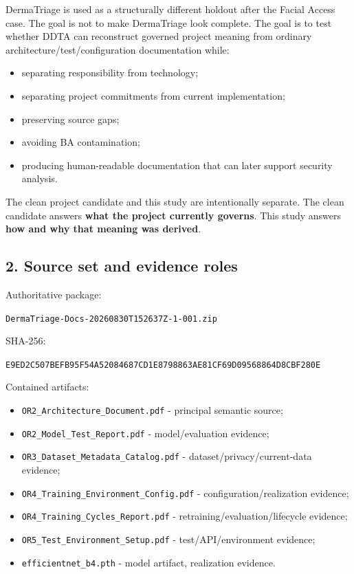 \documentclass[11pt,a4paper]{article}
\providecommand{\tightlist}{\setlength{\itemsep}{0pt}\setlength{\parskip}{0pt}}
\begin{document}
DermaTriage is used as a structurally different holdout after the Facial
Access case. The goal is not to make DermaTriage look complete. The goal
is to test whether DDTA can reconstruct governed project meaning from
ordinary architecture/test/configuration documentation while:

\begin{itemize}
\tightlist
\item
  separating responsibility from technology;
\item
  separating project commitments from current implementation;
\item
  preserving source gaps;
\item
  avoiding BA contamination;
\item
  producing human-readable documentation that can later support security
  analysis.
\end{itemize}

The clean project candidate and this study are intentionally separate.
The clean candidate answers \textbf{what the project currently governs}.
This study answers \textbf{how and why that meaning was derived}.

\subsection{2. Source set and evidence
roles}\label{2-source-set-and-evidence-roles}

Authoritative package:

\texttt{DermaTriage-Docs-20260830T152637Z-1-001.zip}

SHA-256:

\texttt{E9ED2C507BEFB95F54A52084687CD1E8798863AE81CF69D09568864D8CBF280E}

Contained artifacts:

\begin{itemize}
\tightlist
\item
  \texttt{OR2\_Architecture\_Document.pdf} - principal semantic source;
\item
  \texttt{OR2\_Model\_Test\_Report.pdf} - model/evaluation evidence;
\item
  \texttt{OR3\_Dataset\_Metadata\_Catalog.pdf} -
  dataset/privacy/current-data evidence;
\item
  \texttt{OR4\_Training\_Environment\_Config.pdf} -
  configuration/realization evidence;
\item
  \texttt{OR4\_Training\_Cycles\_Report.pdf} -
  retraining/evaluation/lifecycle evidence;
\item
  \texttt{OR5\_Test\_Environment\_Setup.pdf} - test/API/environment
  evidence;
\item
  \texttt{efficientnet\_b4.pth} - model artifact, realization evidence.
\end{itemize}
\end{document}
